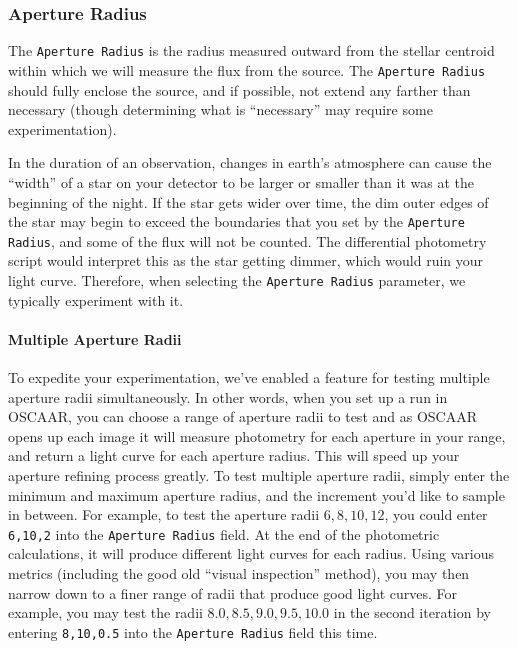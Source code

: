 \documentclass[a4paper]{article}
\newcommand{\code}[1]{\texttt{#1}}
\begin{document}
\subsubsection{Aperture Radius} \label{sec:aperRad}
The \code{Aperture Radius} is the radius measured outward from the stellar centroid within which we will measure the flux from the source. The \code{Aperture Radius} should fully enclose the source, and if possible, not extend any farther than necessary (though determining what is ``necessary'' may require some experimentation). 

In the duration of an observation, changes in earth's atmosphere can cause the ``width'' of a star on your detector to be larger or smaller than it was at the beginning of the night. If the star gets wider over time, the dim outer edges of the star may begin to exceed the boundaries that you set by the \code{Aperture Radius}, and some of the flux will not be counted. The differential photometry script would interpret this as the star getting dimmer, which would ruin your light curve. Therefore, when selecting the \code{Aperture Radius} parameter, we typically experiment with it. 

\paragraph{Multiple Aperture Radii}
To expedite your experimentation, we've enabled a feature for testing multiple aperture radii simultaneously. In other words, when you set up a run in OSCAAR, you can choose a range of aperture radii to test and as OSCAAR opens up each image it will measure photometry for each aperture in your range, and return a light curve for each aperture radius. This will speed up your aperture refining process greatly. To test multiple aperture radii, simply enter the minimum and maximum aperture radius, and the increment you'd like to sample in between. For example, to test the aperture radii $6,8,10,12$, you could enter \code{6,10,2} into the \code{Aperture Radius} field. At the end of the photometric calculations, it will produce different light curves for each radius. Using various metrics (including the good old ``visual inspection'' method), you may then narrow down to a finer range of radii that produce good light curves. For example, you may test the radii $8.0,8.5,9.0,9.5,10.0$ in the second iteration by entering \code{8,10,0.5} into the \code{Aperture Radius} field this time. 
\end{document}
